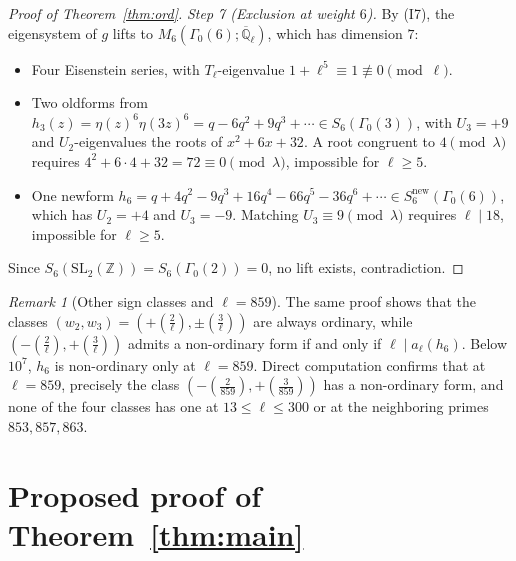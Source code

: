 \documentclass[11pt,reqno]{amsart}
\theoremstyle{definition}
\theoremstyle{remark}
\newtheorem{remark}[theorem]{Remark}
\newcommand{\Z}{\mathbb{Z}}
\newcommand{\Q}{\mathbb{Q}}
\newcommand{\legendre}[2]{\left(\frac{#1}{#2}\right)}
\newcommand{\SL}{\mathrm{SL}}
\newcommand{\new}{\mathrm{new}}
\begin{document}
\begin{proof}[Proof of Theorem~\ref{thm:ord}]
\emph{Step 7 (Exclusion at weight $6$).} By (I7), the eigensystem of $g$ lifts to $M_6(\Gamma_0(6); \overline{\Q}_\ell)$, which has dimension $7$:
\begin{itemize}
  \item Four Eisenstein series, with $T_\ell$-eigenvalue $1 + \ell^5 \equiv 1 \not\equiv 0 \pmod{\ell}$.
  \item Two oldforms from $h_3(z) = \eta(z)^6\eta(3z)^6 = q - 6q^2 + 9q^3 + \cdots \in S_6(\Gamma_0(3))$, with $U_3 = +9$ and $U_2$-eigenvalues the roots of $x^2 + 6x + 32$. A root congruent to $4 \pmod{\lambda}$ requires $4^2 + 6\cdot 4 + 32 = 72 \equiv 0 \pmod{\lambda}$, impossible for $\ell \ge 5$.
  \item One newform $h_6 = q + 4q^2 - 9q^3 + 16q^4 - 66q^5 - 36q^6 + \cdots \in S_6^\new(\Gamma_0(6))$, which has $U_2 = +4$ and $U_3 = -9$. Matching $U_3 \equiv 9 \pmod{\lambda}$ requires $\ell \mid 18$, impossible for $\ell \ge 5$.
\end{itemize}
Since $S_6(\SL_2(\Z)) = S_6(\Gamma_0(2)) = 0$, no lift exists, contradiction.
\end{proof}

\begin{remark}[Other sign classes and $\ell = 859$]
The same proof shows that the classes $(w_2, w_3) = (+\legendre{2}{\ell}, \pm\legendre{3}{\ell})$ are always ordinary, while $(-\legendre{2}{\ell}, +\legendre{3}{\ell})$ admits a non-ordinary form if and only if $\ell \mid a_\ell(h_6)$. Below $10^7$, $h_6$ is non-ordinary only at $\ell = 859$. Direct computation confirms that at $\ell = 859$, precisely the class $(-\legendre{2}{859}, +\legendre{3}{859})$ has a non-ordinary form, and none of the four classes has one at $13 \le \ell \le 300$ or at the neighboring primes $853, 857, 863$.
\end{remark}

\section{Proposed proof of Theorem~\ref{thm:main}}\label{sec:proofB}
\end{document}
